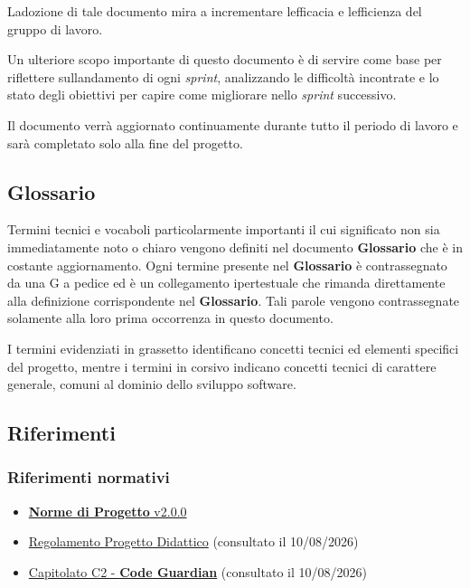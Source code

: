 \documentclass[12pt, a4paper]{article}
\begin{document}
L\textquotesingle adozione di tale documento mira a incrementare
l\textquotesingle efficacia e l\textquotesingle efficienza del gruppo di
lavoro.

Un ulteriore scopo importante di questo documento è di servire come base
per riflettere sull\textquotesingle andamento di ogni \textit{sprint},
analizzando le difficoltà incontrate e lo stato degli obiettivi per
capire come migliorare nello \textit{sprint} successivo.

Il documento verrà aggiornato continuamente durante tutto il periodo di
lavoro e sarà completato solo alla fine del progetto.

\subsection{\textbf{Glossario}}

Termini tecnici e vocaboli particolarmente importanti il cui
significato non sia immediatamente noto o chiaro vengono definiti nel
documento \textbf{Glossario} che è in costante aggiornamento.
Ogni termine
presente nel \textbf{Glossario} è contrassegnato da una G a pedice ed è un
collegamento ipertestuale che rimanda direttamente alla definizione
corrispondente nel \textbf{Glossario}.
Tali parole vengono contrassegnate
solamente alla loro prima occorrenza in questo documento.

I termini evidenziati in grassetto identificano concetti tecnici ed elementi specifici del progetto, mentre i termini in corsivo indicano concetti tecnici di carattere generale, comuni al dominio dello sviluppo software.

\subsection{Riferimenti}

\subsubsection{Riferimenti normativi}

\begin{itemize}
\item
  \href{https://skynetunigroup.github.io/Code_Guardian/Documentazione/PB/norme_di_progetto_v2.0.0.pdf}{\textbf{Norme di Progetto} v2.0.0}
\item  
  \href{https://www.math.unipd.it/~tullio/IS-1/2025/Dispense/PD1.pdf}{Regolamento Progetto Didattico} (consultato il 10/08/2026)
\item
  \href{https://www.math.unipd.it/~tullio/IS-1/2025/Progetto/C2.pdf}{Capitolato C2 - \textbf{Code Guardian}} (consultato il 10/08/2026)
\end{itemize}
\end{document}
